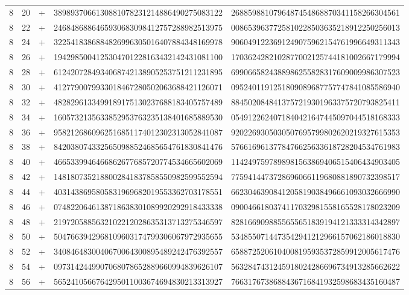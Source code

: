 \begin{longtable}{rrrll}
8 & 20 & + & 3898937066130881078231214886490275083122 & 2688598810796487454868870341158266304561 \\
8 & 22 & + & 2468486886465930683098412757288982513975 & 0086539637725810228503635218912250256013 \\
8 & 24 & + & 3225418386884826996305016407884348169978 & 9060491223691249075962154761996649311343 \\
8 & 26 & + & 1942985004125304701228163432142431081100 & 1703624282102877002125744181002667179994 \\
8 & 28 & + & 6124207284934068742138905253751211231895 & 6990665824388986255828317609009986307523 \\
8 & 30 & + & 4127790079933018467280502063688421126071 & 0952401191251809089687757747841085586940 \\
8 & 32 & + & 4828296133499189175130237688183405757489 & 8845020848413757219301963375720793825411 \\
8 & 34 & + & 1605732135633852953763235138401685889530 & 0549122624071840421647445097044518168333 \\
8 & 36 & + & 9582126860962516851174012302313052841087 & 9202269305030507695799802620219327615353 \\
8 & 38 & + & 8420380743325650988524685654761830841476 & 5766169613778476625633618728204534761983 \\
8 & 40 & + & 4665339946466862677685720774534665602069 & 1142497597898981563869406515406434903405 \\
8 & 42 & + & 1481807352188002841837858550982599552594 & 7759414473728696066119680881890732398517 \\
8 & 44 & + & 4031438695805831969682019553362703178551 & 6623046390841205819038496661093032666990 \\
8 & 46 & + & 0748220646138718638301089920292918433338 & 0900466180374117032981558165528178023209 \\
8 & 48 & + & 2197205885632102212028635313713275346597 & 8281669098855655651839194121333314342897 \\
8 & 50 & + & 5047663942968109603174799306067972935655 & 5348550714473542941212966157062186018830 \\
8 & 52 & + & 3408464830040670064300895489242476392557 & 6588725206104008195935372859912005617476 \\
8 & 54 & + & 0973142449907068078652889660994839626107 & 5632847431245918024286696734913285662622 \\
8 & 56 & + & 5652410566764295011003674694830213313927 & 7663176738688436716841932598683435160487 \\

\end{longtable}
